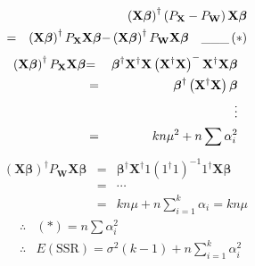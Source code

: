 \documentclass{article}
\begin{document}
\begin{eqnarray*}
&&\left( \mathbf{X\beta }\right) ^{\dagger }\left( P_{\mathbf{X}}-P_{\mathbf{%
W}}\right) \mathbf{X\beta } \\
&=&\left( \mathbf{X\beta }\right) ^{\dagger }P_{\mathbf{X}}\mathbf{X\beta -}%
\left( \mathbf{X\beta }\right) ^{\dagger }P_{\mathbf{W}}\mathbf{X\beta \quad
\_\_\_}\left( \ast \right) 
\end{eqnarray*}%
\begin{eqnarray*}
\left( \mathbf{X\beta }\right) ^{\dagger }P_{\mathbf{X}}\mathbf{X\beta } &%
\mathbf{=}&\mathbf{\mathbf{\beta }^{\dagger }\mathbf{X^{\dagger }}X}\left( 
\mathbf{X}^{\dagger }\mathbf{X}\right) ^{-}\mathbf{X}^{\dagger }\mathbf{%
X\beta } \\
&=&\mathbf{\mathbf{\beta }^{\dagger }}\left( \mathbf{\mathbf{X^{\dagger }}X}%
\right) \mathbf{\beta } \\
&&\vdots  \\
&=&kn\mu ^{2}+n\sum \alpha _{i}^{2}
\end{eqnarray*}%
\begin{eqnarray*}
\left( \mathbf{X\beta }\right) ^{\dagger }P_{\mathbf{W}}\mathbf{X\beta } &=&%
\mathbf{\mathbf{\beta }^{\dagger }\mathbf{X^{\dagger }}}1\left( 1^{\dagger
}1\right) ^{-1}1^{\dagger }\mathbf{X\beta } \\
&=&\cdots  \\
&=&kn\mu +n\sum\limits_{i=1}^{k}\alpha _{i}=kn\mu 
\end{eqnarray*}%
\begin{eqnarray*}
&\therefore &\left( \ast \right) =n\sum \alpha _{i}^{2} \\
&\therefore &E\left( \text{SSR}\right) =\sigma ^{2}\left( k-1\right)
+n\sum\limits_{i=1}^{k}\alpha _{i}^{2}
\end{eqnarray*}
\end{document}
